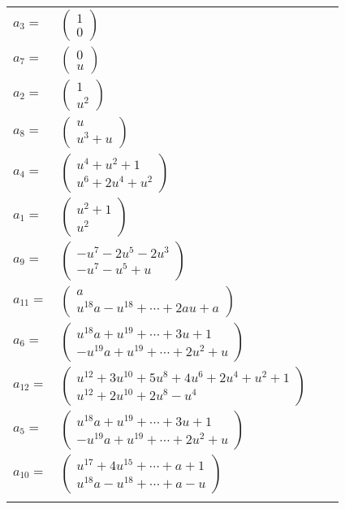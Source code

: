 \documentclass[1p]{elsarticle_modified}
\theoremstyle{definition}
\begin{document}
\begin{tabular}{m{7pt} m{180pt} m{7pt} m{180pt} }
\flushright $a_{3}=$&$\begin{pmatrix}1\\0\end{pmatrix}$ \\
\flushright $a_{7}=$&$\begin{pmatrix}0\\u\end{pmatrix}$ \\
\flushright $a_{2}=$&$\begin{pmatrix}1\\u^2\end{pmatrix}$ \\
\flushright $a_{8}=$&$\begin{pmatrix}u\\u^3+u\end{pmatrix}$ \\
\flushright $a_{4}=$&$\begin{pmatrix}u^4+u^2+1\\u^6+2 u^4+u^2\end{pmatrix}$ \\
\flushright $a_{1}=$&$\begin{pmatrix}u^2+1\\u^2\end{pmatrix}$ \\
\flushright $a_{9}=$&$\begin{pmatrix}- u^7-2 u^5-2 u^3\\- u^7- u^5+u\end{pmatrix}$ \\
\flushright $a_{11}=$&$\begin{pmatrix}a\\u^{18} a- u^{18}+\cdots+2 a u+a\end{pmatrix}$ \\
\flushright $a_{6}=$&$\begin{pmatrix}u^{18} a+u^{19}+\cdots+3 u+1\\- u^{19} a+u^{19}+\cdots+2 u^2+u\end{pmatrix}$ \\
\flushright $a_{12}=$&$\begin{pmatrix}u^{12}+3 u^{10}+5 u^8+4 u^6+2 u^4+u^2+1\\u^{12}+2 u^{10}+2 u^8- u^4\end{pmatrix}$ \\
\flushright $a_{5}=$&$\begin{pmatrix}u^{18} a+u^{19}+\cdots+3 u+1\\- u^{19} a+u^{19}+\cdots+2 u^2+u\end{pmatrix}$ \\
\flushright $a_{10}=$&$\begin{pmatrix}u^{17}+4 u^{15}+\cdots+a+1\\u^{18} a- u^{18}+\cdots+a- u\end{pmatrix}$\\&\end{tabular}
\end{document}
